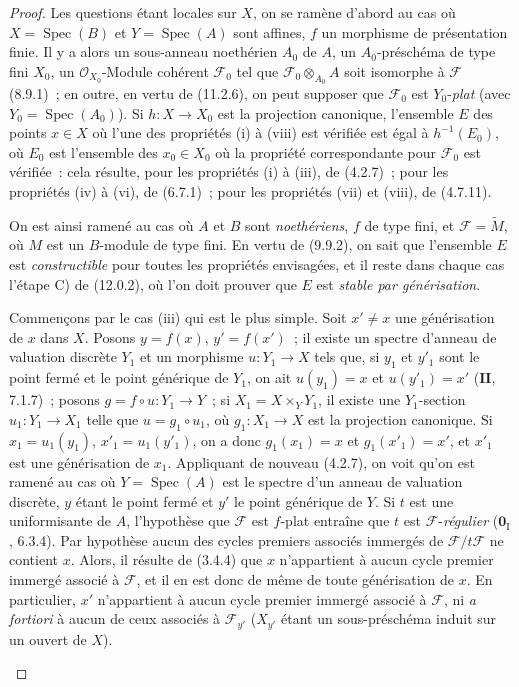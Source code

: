 \begin{proof}
Les questions étant locales sur $X$, on se ramène d'abord au cas où
$X=\operatorname{Spec}(B)$ et $Y=\operatorname{Spec}(A)$ sont affines, $f$ un
morphisme de présentation finie. Il y a alors un sous-anneau noethérien $A_0$
de $A$, un $A_0$-préschéma de type fini $X_0$, un
$\mathcal O_{X_0}$-Module cohérent $\mathcal F_0$ tel que
$\mathcal F_0\otimes_{A_0}A$ soit isomorphe à $\mathcal F$ (8.9.1)~; en
outre, en vertu de (11.2.6), on peut supposer que $\mathcal F_0$ est
$Y_0$-\emph{plat} (avec $Y_0=\operatorname{Spec}(A_0)$). Si $h:X\to X_0$ est la
projection canonique, l'ensemble $E$ des points $x\in X$ où l'une des
propriétés (i) à (viii) est vérifiée est égal à $h^{-1}(E_0)$, où $E_0$ est
l'ensemble des $x_0\in X_0$ où la propriété correspondante pour $\mathcal F_0$
est vérifiée~: cela résulte, pour les propriétés (i) à (iii), de (4.2.7)~; pour
les propriétés (iv) à (vi), de (6.7.1)~; pour les propriétés (vii) et (viii),
de (4.7.11).

On est ainsi ramené au cas où $A$ et $B$ sont \emph{noethériens}, $f$ de type fini,
et $\mathcal F=\widetilde M$, où $M$ est un $B$-module de type fini. En vertu
de (9.9.2), on sait que l'ensemble $E$ est \emph{constructible} pour toutes les
propriétés envisagées, et il reste dans chaque cas l'étape C) de (12.0.2), où
l'on doit prouver que $E$ est \emph{stable par générisation}.

\begin{env}[12.1.1.1]
\label{IV.12.1.1.1-fr}
Commençons par le cas (iii) qui est le plus simple. Soit $x'\ne x$ une
générisation de $x$ dans $X$. Posons $y=f(x)$, $y'=f(x')$~; il existe un
spectre d'anneau de valuation discrète $Y_1$ et un morphisme $u:Y_1\to X$ tels
que, si $y_1$ et $y'_1$ sont le point fermé et le point générique de $Y_1$, on
ait $u(y_1)=x$ et $u(y'_1)=x'$ ($\mathbf{II}$, 7.1.7)~; posons
$g=f\circ u:Y_1\to Y$~; si $X_1=X\times_YY_1$, il existe une $Y_1$-section
$u_1:Y_1\to X_1$ telle que $u=g_1\circ u_1$, où $g_1:X_1\to X$ est la
projection canonique. Si $x_1=u_1(y_1)$, $x'_1=u_1(y'_1)$, on a donc
$g_1(x_1)=x$ et $g_1(x'_1)=x'$, et $x'_1$ est une générisation de $x_1$.
Appliquant de nouveau (4.2.7), on voit
qu'on est ramené au cas où $Y=\operatorname{Spec}(A)$ est le spectre d'un
anneau de valuation discrète, $y$ étant le point fermé et $y'$ le point
générique de $Y$. Si $t$ est une uniformisante de $A$, l'hypothèse que
$\mathcal F$ est $f$-plat entraîne que $t$ est $\mathcal F$-\emph{régulier}
($\mathbf 0_{\mathrm I}$, 6.3.4). Par hypothèse aucun des cycles premiers
associés immergés de $\mathcal F/t\mathcal F$ ne contient $x$. Alors, il
résulte de (3.4.4) que $x$ n'appartient à aucun cycle premier immergé associé à
$\mathcal F$, et il en est donc de même de toute générisation de $x$. En
particulier, $x'$ n'appartient à aucun cycle premier immergé associé à
$\mathcal F$, ni \emph{a fortiori} à aucun de ceux associés à
$\mathcal F_{y'}$ ($X_{y'}$ étant un sous-préschéma induit sur un ouvert de
$X$).
\end{env}


\end{proof}
